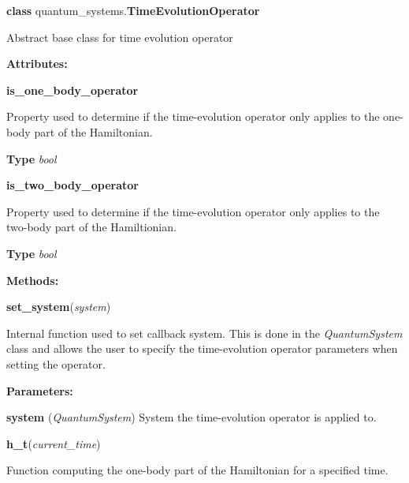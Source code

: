 \begin{tcolorbox}
    {\selectfont
    \textbf{class} quantum\_systems.\textbf{TimeEvolutionOperator}

    \vspace{1em}
    Abstract base class for time evolution operator 

    \vspace{1em}
    \textbf{Attributes:}

    \hspace{2em} \textbf{is\_one\_body\_operator} 
    \begin{adjustwidth}{4em}{}
        Property used to determine if the time-evolution operator only applies
        to the one-body part of the Hamiltonian.

        \textbf{Type} \emph{bool}       
    \end{adjustwidth}

    \hspace{2em} \textbf{is\_two\_body\_operator}
    \begin{adjustwidth}{4em}{}
        Property used to determine if the time-evolution operator only applies
        to the two-body part of the Hamiltionian.

        \textbf{Type} \emph{bool}
    \end{adjustwidth}

    \vspace{1em}
    \textbf{Methods:}

    \hspace{2em} \textbf{set\_system}(\emph{system})
    \begin{adjustwidth}{4em}{}
        Internal function used to set callback system. This is done in 
        the \emph{QuantumSystem} class and allows the user to specify 
        the time-evolution operator parameters when setting the 
        operator.

        \textbf{Parameters:}

        \hspace{1.5em} \textbf{system} (\emph{QuantumSystem}) 
            System the time-evolution operator is applied to.

    \end{adjustwidth}

    \hspace{2em} \textbf{h\_t}(\emph{current\_time})
    \begin{adjustwidth}{4em}{}
        Function computing the one-body part of the Hamiltonian for a 
        specified time.


\end{adjustwidth}}
\end{tcolorbox}
